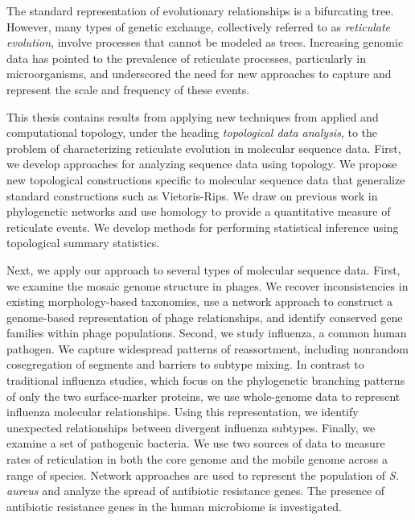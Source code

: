 
The standard representation of evolutionary relationships is a bifurcating tree.
However, many types of genetic exchange, collectively referred to as \emph{reticulate evolution}, involve processes that cannot be modeled as trees.
Increasing genomic data has pointed to the prevalence of reticulate processes, particularly in microorganisms, and underscored the need for new approaches to capture and represent the scale and frequency of these events.

This thesis contains results from applying new techniques from applied and computational topology, under the heading \emph{topological data analysis}, to the problem of characterizing reticulate evolution in molecular sequence data.
First, we develop approaches for analyzing sequence data using topology.
We propose new topological constructions specific to molecular sequence data that generalize standard constructions such as Vietoris-Rips.
We draw on previous work in phylogenetic networks and use homology to provide a quantitative measure of reticulate events.
We develop methods for performing statistical inference using topological summary statistics.

Next, we apply our approach to several types of molecular sequence data.
First, we examine the mosaic genome structure in phages.
We recover inconsistencies in existing morphology-based taxonomies, use a network approach to construct a genome-based representation of phage relationships, and identify conserved gene families within phage populations.
Second, we study influenza, a common human pathogen.
We capture widespread patterns of reassortment, including nonrandom cosegregation of segments and barriers to subtype mixing.
In contrast to traditional influenza studies, which focus on the phylogenetic branching patterns of only the two surface-marker proteins, we use whole-genome data to represent influenza molecular relationships.
Using this representation, we identify unexpected relationships between divergent influenza subtypes.
Finally, we examine a set of pathogenic bacteria.
We use two sources of data to measure rates of reticulation in both the core genome and the mobile genome across a range of species.
Network approaches are used to represent the population of \emph{S. aureus} and analyze the spread of antibiotic resistance genes.
The presence of antibiotic resistance genes in the human microbiome is investigated.
